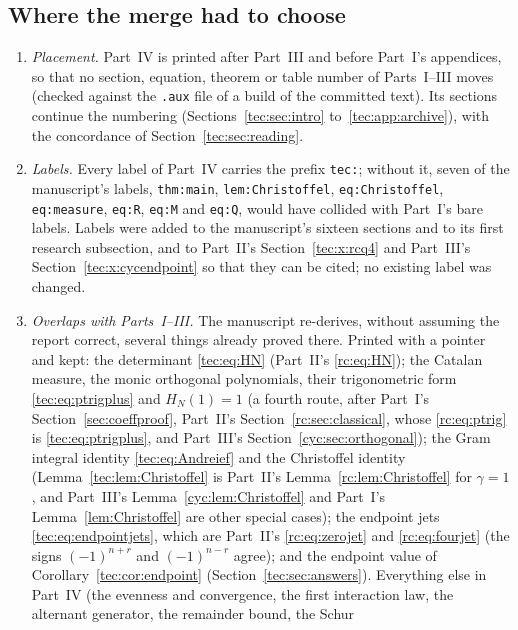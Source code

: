 \documentclass[11pt,a4paper]{article}
\numberwithin{equation}{section}
\theoremstyle{definition}
\theoremstyle{remark}
\begin{document}
\subsection{Where the merge had to choose}\label{tec:sec:merge}
\begin{enumerate}[leftmargin=*,itemsep=2pt]
\item \emph{Placement.}  Part~IV is printed after Part~III and before
 Part~I's appendices, so that no section, equation, theorem or table
 number of Parts~I--III moves (checked against the \texttt{.aux} file of a
 build of the committed text).  Its sections continue the numbering
 (Sections~\ref{tec:sec:intro} to~\ref{tec:app:archive}), with the
 concordance of Section~\ref{tec:sec:reading}.
\item \emph{Labels.}  Every label of Part~IV carries the prefix
 \texttt{tec:}; without it, seven of the manuscript's labels,
 \texttt{thm:main}, \texttt{lem:Christoffel}, \texttt{eq:Christoffel},
 \texttt{eq:measure}, \texttt{eq:R}, \texttt{eq:M} and \texttt{eq:Q}, would
 have collided with Part~I's bare labels.  Labels were added to the
 manuscript's sixteen sections and to its first research subsection, and
 to Part~II's Section~\ref{tec:x:rcq4} and Part~III's
 Section~\ref{tec:x:cycendpoint} so that they can be cited; no existing
 label was changed.
\item \emph{Overlaps with Parts~I--III.}  The manuscript re-derives, without
 assuming the report correct, several things already proved there.  Printed
 with a pointer and kept: the determinant \eqref{tec:eq:HN} (Part~II's
 \eqref{rc:eq:HN}); the Catalan measure, the monic orthogonal polynomials,
 their trigonometric form \eqref{tec:eq:ptrigplus} and $H_N(1)=1$ (a fourth
 route, after Part~I's Section~\ref{sec:coeffproof}, Part~II's
 Section~\ref{rc:sec:classical}, whose \eqref{rc:eq:ptrig} is
 \eqref{tec:eq:ptrigplus}, and Part~III's
 Section~\ref{cyc:sec:orthogonal}); the Gram integral identity
 \eqref{tec:eq:Andreief} and the Christoffel identity
 (Lemma~\ref{tec:lem:Christoffel} is Part~II's
 Lemma~\ref{rc:lem:Christoffel} for $\gamma=1$, and Part~III's
 Lemma~\ref{cyc:lem:Christoffel} and Part~I's Lemma~\ref{lem:Christoffel}
 are other special cases); the endpoint jets \eqref{tec:eq:endpointjets},
 which are Part~II's \eqref{rc:eq:zerojet} and \eqref{rc:eq:fourjet}
 (the signs $(-1)^{n+r}$ and $(-1)^{n-r}$ agree); and the endpoint value
 of Corollary~\ref{tec:cor:endpoint} (Section~\ref{tec:sec:answers}).
 Everything else in Part~IV (the evenness and convergence, the first
 interaction law, the alternant generator, the remainder bound, the Schur

\end{enumerate}
\end{document}
